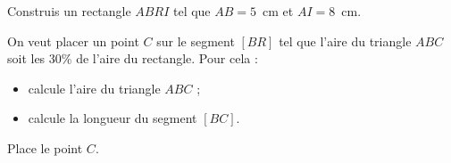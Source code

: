 \begin{myenumerate}
\item Construis un rectangle $ABRI$ tel que $AB=5$~cm et $AI=8$~cm.
\item On veut placer un point $C$ sur le segment $[BR]$ tel que l'aire du triangle $ABC$ soit les 30\% de l'aire du rectangle. Pour cela :
  \begin{itemize}
  \item calcule l'aire du triangle $ABC$ ;
  \item calcule la longueur du segment $[BC]$.
  \end{itemize}
\item Place le point $C$.
\end{myenumerate}

